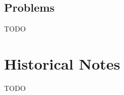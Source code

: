 
\section{Problems}
\label{sec:approximation-divided-problems}
TODO




\chapter{Historical Notes}
\label{ch:approximation-historical-notes}

TODO

